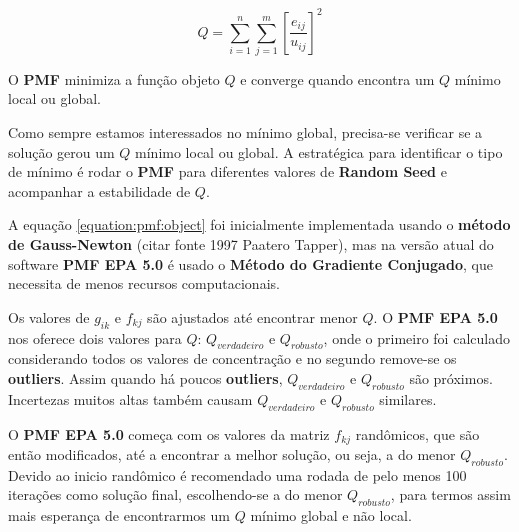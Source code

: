 \begin{equation}
  Q = \sum_{i=1}^n \sum_{j=1}^m  \left[ \frac{e_{ij}} {u_{ij}} \right] ^2
  \label{equation:pmf:object}
\end{equation}

O \textbf{PMF} minimiza a função objeto $Q$ e converge quando encontra um $Q$ 
mínimo local ou global.%


Como sempre estamos interessados no mínimo global, precisa-se verificar se a 
solução gerou um $Q$ mínimo local ou global. A estratégica para identificar
o tipo de mínimo é rodar o \textbf{PMF} para diferentes valores de 
\textbf{Random Seed} e acompanhar a estabilidade de $Q$.

A equação \ref{equation:pmf:object} foi inicialmente implementada usando 
o \textbf{método de Gauss-Newton}  (citar fonte 1997 Paatero Tapper), mas na 
versão atual do software \textbf{PMF EPA 5.0} é usado o 
\textbf{Método do Gradiente Conjugado}, que necessita de menos recursos 
computacionais. 

Os valores de $g_{ik}$ e $f_{kj}$ são ajustados até encontrar menor $Q$. 
O \textbf{PMF EPA 5.0} nos oferece dois valores para $Q$: $Q_{verdadeiro}$ e 
$Q_{robusto}$, onde o primeiro foi calculado considerando todos os valores 
de concentração e no segundo remove-se os \textbf{outliers}.
Assim quando há poucos \textbf{outliers}, $Q_{verdadeiro}$ e $Q_{robusto}$ 
são próximos. Incertezas muitos altas também causam $Q_{verdadeiro}$ e 
$Q_{robusto}$ similares.

O \textbf{PMF EPA 5.0} começa com os valores da matriz $f_{kj}$ randômicos, 
que são então modificados, até a encontrar a melhor solução, ou seja, 
a do menor $Q_{robusto}$. 
Devido ao inicio randômico é recomendado uma rodada de pelo menos 100 iterações 
como solução final, escolhendo-se a do menor $Q_{robusto}$, para termos assim 
mais esperança de encontrarmos um $Q$ mínimo global e não local. 



